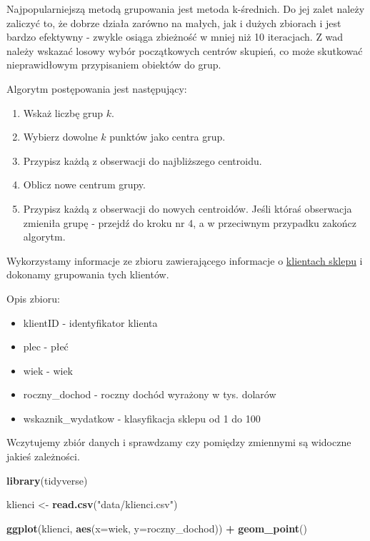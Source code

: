 \documentclass[]{book}
\newenvironment{Shaded}{\begin{snugshade}}{\end{snugshade}}
\newcommand{\DataTypeTok}[1]{\textcolor[rgb]{0.13,0.29,0.53}{#1}}
\newcommand{\KeywordTok}[1]{\textcolor[rgb]{0.13,0.29,0.53}{\textbf{#1}}}
\newcommand{\NormalTok}[1]{#1}
\newcommand{\OperatorTok}[1]{\textcolor[rgb]{0.81,0.36,0.00}{\textbf{#1}}}
\newcommand{\StringTok}[1]{\textcolor[rgb]{0.31,0.60,0.02}{#1}}
\providecommand{\tightlist}{%
  \setlength{\itemsep}{0pt}\setlength{\parskip}{0pt}}
\begin{document}
Najpopularniejszą metodą grupowania jest metoda k-średnich. Do jej zalet należy zaliczyć to, że dobrze działa zarówno na małych, jak i dużych zbiorach i jest bardzo efektywny - zwykle osiąga zbieżność w mniej niż 10 iteracjach. Z wad należy wskazać losowy wybór początkowych centrów skupień, co może skutkować nieprawidłowym przypisaniem obiektów do grup.

Algorytm postępowania jest następujący:

\begin{enumerate}
\def\labelenumi{\arabic{enumi}.}
\tightlist
\item
  Wskaż liczbę grup \(k\).
\item
  Wybierz dowolne \(k\) punktów jako centra grup.
\item
  Przypisz każdą z obserwacji do najbliższego centroidu.
\item
  Oblicz nowe centrum grupy.
\item
  Przypisz każdą z obserwacji do nowych centroidów. Jeśli któraś obserwacja zmieniła grupę - przejdź do kroku nr 4, a w przeciwnym przypadku zakończ algorytm.
\end{enumerate}

Wykorzystamy informacje ze zbioru zawierającego informacje o \href{data/klienci.csv}{klientach sklepu} i dokonamy grupowania tych klientów.

Opis zbioru:

\begin{itemize}
\tightlist
\item
  klientID - identyfikator klienta
\item
  plec - płeć
\item
  wiek - wiek
\item
  roczny\_dochod - roczny dochód wyrażony w tys. dolarów
\item
  wskaznik\_wydatkow - klasyfikacja sklepu od 1 do 100
\end{itemize}

Wczytujemy zbiór danych i sprawdzamy czy pomiędzy zmiennymi są widoczne jakieś zależności.

\begin{Shaded}
\begin{Highlighting}[]
\KeywordTok{library}\NormalTok{(tidyverse)}

\NormalTok{klienci <-}\StringTok{ }\KeywordTok{read.csv}\NormalTok{(}\StringTok{"data/klienci.csv"}\NormalTok{)}

\KeywordTok{ggplot}\NormalTok{(klienci, }\KeywordTok{aes}\NormalTok{(}\DataTypeTok{x=}\NormalTok{wiek, }\DataTypeTok{y=}\NormalTok{roczny_dochod)) }\OperatorTok{+}
\StringTok{  }\KeywordTok{geom_point}\NormalTok{()}
\end{Highlighting}
\end{Shaded}
\end{document}
